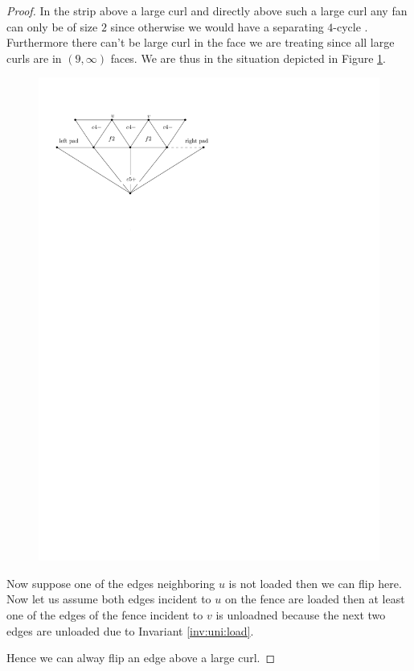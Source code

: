 \begin{proof}
  In the strip above a large curl and directly above such a large curl any fan can only be of size $2$ since otherwise we would have a separating $4$-cycle . Furthermore there can't be large curl in the face we are treating since all large curls are in $(9,\infty)$ faces.  We are thus in the situation depicted in Figure \ref{fig:uni:flipAboveLargeCurl}.

  \begin{figure}[h]
    \centering
    \includegraphics[scale=1]{unifiedAlgo/img/flipAboveLargeCurl}
    \caption{}
    \label{fig:uni:flipAboveLargeCurl}
  \end{figure}

  Now suppose one of the edges neighboring $u$ is not loaded then we can flip here. Now let us assume both edges incident to $u$ on the fence are loaded then at least one of the edges of the fence incident to $v$ is unloadned  because the next two edges are unloaded due to Invariant \ref{inv:uni:load}.

  Hence we can alway flip an edge above a large curl.
\end{proof}


